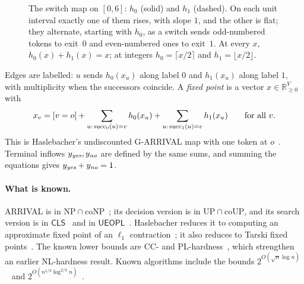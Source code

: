 \begin{figure}[t]
\centering
{}
\caption{The switch map on $[0,6]$: $h_0$ (solid) and $h_1$ (dashed). On each unit interval exactly one of
them rises, with slope $1$, and the other is flat; they alternate, starting with $h_0$, as a switch sends
odd-numbered tokens to exit~$0$ and even-numbered ones to exit~$1$. At every $x$, $h_0(x)+h_1(x)=x$; at
integers $h_0=\lceil x/2\rceil$ and $h_1=\lfloor x/2\rfloor$.}
\label{fig:switchmap}
\end{figure} Edges are labelled: $u$ sends $h_0(x_u)$ along label $0$ and $h_1(x_u)$ along label $1$, with
multiplicity when the successors coincide. A \emph{fixed point} is a vector $x\in\mathbb{R}^V_{\ge0}$ with
\begin{equation}\label{eq:fixedpoint}
x_v=[v=o]+\sum_{u:\,\mathrm{succ}_0(u)=v}h_0(x_u)+\sum_{u:\,\mathrm{succ}_1(u)=v}h_1(x_u)\qquad\text{for all }v.
\end{equation}
This is Haslebacher's undiscounted G-ARRIVAL map with one token at $o$~\cite[\S4]{haslebacher25}.
Terminal inflows $y_{\textit{yes}},y_{\textit{no}}$ are defined by the same sums, and summing the equations gives
$y_{\textit{yes}}+y_{\textit{no}}=1$.

\paragraph{What is known.} ARRIVAL is in $\mathrm{NP}\cap\mathrm{coNP}$~\cite{dgkmw17}; its decision
version is in $\mathrm{UP}\cap\mathrm{coUP}$, and its search version is in $\mathsf{CLS}$~\cite{ghhkms18}
and in $\mathsf{UEOPL}$~\cite{ghhkms18,fgms18}. Haslebacher reduces it to computing an approximate fixed
point of an $\ell_1$ contraction~\cite{haslebacher25}; it also reduces to Tarski fixed
points~\cite{ghh21}. The known lower bounds are CC- and PL-hardness~\cite{manuell21}, which strengthen an earlier NL-hardness result. Known
algorithms include the bounds $2^{O(\sqrt n\log n)}$~\cite{ghh21} and
$2^{O(n^{1/3}\log^{2/3}n)}$~\cite{glm26}.

